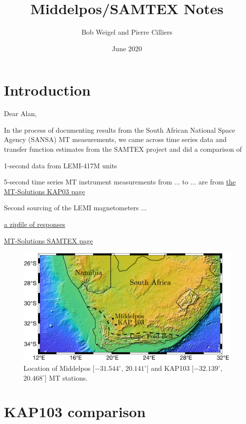 \documentclass{article}
\title{Middelpos/SAMTEX Notes}
\author{Bob Weigel and Pierre Cilliers}
\date{June 2020}
\begin{document}

\section{Introduction}

Dear Alan,

In the process of documenting results from the South African National Space Agency (SANSA) MT measurements, we came across time series data and transfer function estimates from the SAMTEX project and did a comparison of 

1-second data from LEMI-417M units 

5-second time series MT instrument measurements from ... to ... are from \href{https://www.mtnet.info/data/kap03/kap03.html}{the MT-Solutions KAP03 page}

Second sourcing of the LEMI magnetometers ... 

\href{https://www.mtnet.info/data/samtex/samtex.zip}{a zipfile of responses}


\href{https://www.mtnet.info/data/samtex/samtex.html}{MT-Solutions SAMTEX page}

\begin{figure}[h!]
\centering
\includegraphics[width=\textwidth]{figures/map.pdf}
\caption{Location of Middelpos [$-31.544^\circ$, $20.141^\circ$] and KAP103 [$-32.139^\circ$, $20.468^\circ$] MT stations.}
\label{fig:map}
\end{figure}

\clearpage

\section{KAP103 comparison}
\end{document}
